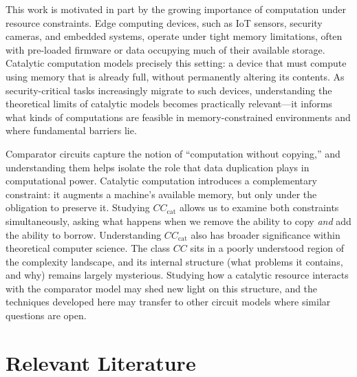 \documentclass[12pt]{article}
\newcommand{\CCC}{CC_\text{cat}}
\begin{document}
This work is motivated in part by the growing importance of computation under resource constraints. Edge computing devices, such as IoT sensors, security cameras, and embedded systems, operate under tight memory limitations, often with pre-loaded firmware or data occupying much of their available storage. Catalytic computation models precisely this setting: a device that must compute using memory that is already full, without permanently altering its contents. As security-critical tasks increasingly migrate to such devices, understanding the theoretical limits of catalytic models becomes practically relevant---it informs what kinds of computations are feasible in memory-constrained environments and where fundamental barriers lie.

Comparator circuits capture the notion of ``computation without copying,'' and understanding them helps isolate the role that data duplication plays in computational power. Catalytic computation introduces a complementary constraint: it augments a machine's available memory, but only under the obligation to preserve it. Studying $\CCC$ allows us to examine both constraints simultaneously, asking what happens when we remove the ability to copy \emph{and} add the ability to borrow. Understanding $\CCC$ also has broader significance within theoretical computer science. The class $CC$ sits in a poorly understood region of the complexity landscape, and its internal structure (what problems it contains, and why) remains largely mysterious. Studying how a catalytic resource interacts with the  comparator model may shed new light on this structure, and the techniques developed here may transfer to other circuit models where similar questions are open.


\section{Relevant Literature}
\end{document}
